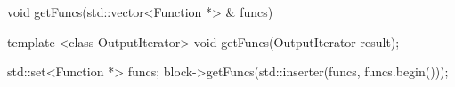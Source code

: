 \begin{apient}
void getFuncs(std::vector<Function *> & funcs)
\end{apient}

\begin{apient}
template <class OutputIterator>
void getFuncs(OutputIterator result);
\end{apient}

\begin{apient}
std::set<Function *> funcs;
block->getFuncs(std::inserter(funcs, funcs.begin()));
\end{apient}

